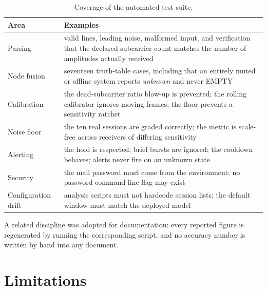 \documentclass[11pt,a4paper]{article}
\begin{document}
\begin{table}[H]
\centering
\caption{Coverage of the automated test suite.}
\begin{tabularx}{\linewidth}{@{}lX@{}}
\toprule
\textbf{Area} & \textbf{Examples} \\
\midrule
Parsing & valid lines, leading noise, malformed input, and verification that the
declared subcarrier count matches the number of amplitudes actually received \\
Node fusion & seventeen truth-table cases, including that an entirely
muted or offline system reports \emph{unknown} and never EMPTY \\
Calibration & the dead-subcarrier ratio blow-up is prevented; the rolling
calibrator ignores moving frames; the floor prevents a sensitivity ratchet \\
Noise floor & the ten real sessions are graded correctly; the metric is
scale-free across receivers of differing sensitivity \\
Alerting & the hold is respected; brief bursts are ignored; the cooldown
behaves; alerts never fire on an unknown state \\
Security & the mail password must come from the environment; no password
command-line flag may exist \\
Configuration drift & analysis scripts must not hardcode session lists; the
default window must match the deployed model \\
\bottomrule
\end{tabularx}
\end{table}

\noindent
A related discipline was adopted for documentation: every reported figure is
regenerated by running the corresponding script, and no accuracy number is
written by hand into any document.

\section{Limitations}
\label{sec:limitations}
\end{document}
